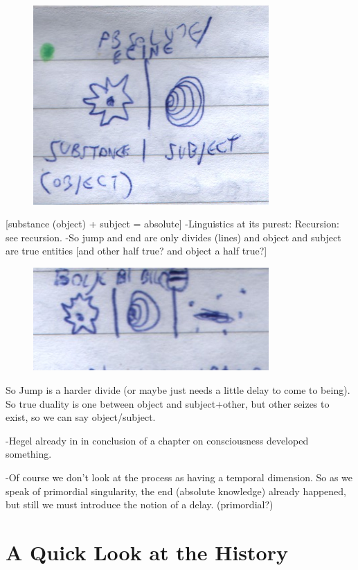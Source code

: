 \documentclass[10pt]{book}
\begin{document}
\begin{figure}[ht!]
\centering
\includegraphics[width=90mm]{scan09.jpg}
\label{overflow}
\end{figure}
[substance (object) +  subject = absolute]
-Linguistics at its purest: Recursion: see recursion.
-So jump and end are only divides (lines) and object and subject are true entities [and other half true? and object a half true?] 
\begin{figure}[ht!]
\centering
\includegraphics[width=90mm]{scan10.jpg}
\label{overflow}
\end{figure}
So Jump is a harder divide (or maybe just needs a little delay to come to being). So true duality is one between object and subject+other, but other seizes to exist, so we can say object/subject.

-Hegel already in in conclusion of a chapter on consciousness developed something.

-Of course we don't look at the process as having a temporal dimension. So as we speak of primordial singularity, the end (absolute knowledge) already happened, but still we must introduce the notion of a delay. (primordial?) 

\chapter{A Quick Look at the History}
\end{document}
